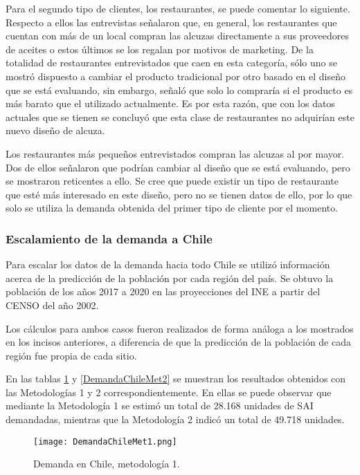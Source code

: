 Para el segundo tipo de clientes, los restaurantes, se puede comentar lo siguiente. Respecto a ellos las entrevistas señalaron que, en general, los restaurantes que cuentan con más de un local compran las alcuzas directamente a sus proveedores de aceites o estos últimos se los regalan por motivos de marketing. De la totalidad de restaurantes entrevistados que caen en esta categoría, sólo uno se mostró dispuesto a cambiar el producto tradicional por otro basado en el diseño que se está evaluando, sin embargo, señaló que solo lo compraría si el producto es más barato que el utilizado actualmente. Es por esta razón, que con los datos actuales que se tienen se concluyó que esta clase de restaurantes no adquirían este nuevo diseño de alcuza.

Los restaurantes más pequeños entrevistados compran las alcuzas al por mayor. Dos de ellos señalaron que podrían cambiar al diseño que se está evaluando, pero se mostraron reticentes a ello. Se cree que puede existir un tipo de restaurante que esté más interesado en este diseño, pero no se tienen datos de ello, por lo que solo se utiliza la demanda obtenida del primer tipo de cliente por el momento.

\subsubsection{Escalamiento de la demanda a Chile}

Para escalar los datos de la demanda hacia todo Chile se utilizó información acerca de la predicción de la población por cada región del país. Se obtuvo la población de los años 2017 a 2020 en las proyecciones del INE a partir del CENSO del año 2002.

Los cálculos para ambos casos fueron realizados de forma análoga a los mostrados en los incisos anteriores, a diferencia de que la predicción de la población de cada región fue propia de cada sitio.

En las tablas \ref{DemandaChileMet1} y \ref{DemandaChileMet2} se muestran los resultados obtenidos con las Metodologías 1 y 2 correspondientemente. En ellas se puede observar que mediante la Metodología 1 se estimó un total de 28.168 unidades de SAI demandadas, mientras que la Metodología 2 indicó un total de 49.718 unidades.

\begin{figure}[H]
\centering
\texttt{[image: DemandaChileMet1.png]}
\caption{Demanda en Chile, metodología 1.}
\label{DemandaChileMet1}
\end{figure}

